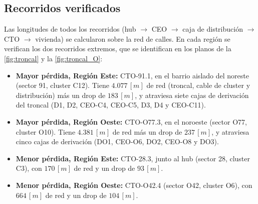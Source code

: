 \subsection{Recorridos verificados}
Las longitudes de todos los recorridos (hub $\rightarrow$ CEO $\rightarrow$ caja de distribución $\rightarrow$ CTO $\rightarrow$ vivienda) se calcularon sobre la red de calles. En cada región se verifican los dos recorridos extremos, que se identifican en los planos de la \autoref{fig:troncal} y la \autoref{fig:troncal_O}:
\begin{itemize}
    \item \textbf{Mayor pérdida, Región Este:} CTO-91.1, en el barrio aislado del noreste (sector 91, cluster C12). Tiene $4.077 \, [m]$ de red (troncal, cable de cluster y distribución) más un drop de $183 \, [m]$, y atraviesa siete cajas de derivación del troncal (D1, D2, CEO-C4, CEO-C5, D3, D4 y CEO-C11).
    \item \textbf{Mayor pérdida, Región Oeste:} CTO-O77.3, en el noroeste (sector O77, cluster O10). Tiene $4.381 \, [m]$ de red más un drop de $237 \, [m]$, y atraviesa cinco cajas de derivación (DO1, CEO-O6, DO2, CEO-O8 y DO3).
    \item \textbf{Menor pérdida, Región Este:} CTO-28.3, junto al hub (sector 28, cluster C3), con $170 \, [m]$ de red y un drop de $93 \, [m]$.
    \item \textbf{Menor pérdida, Región Oeste:} CTO-O42.4 (sector O42, cluster O6), con $664 \, [m]$ de red y un drop de $104 \, [m]$.
\end{itemize}

